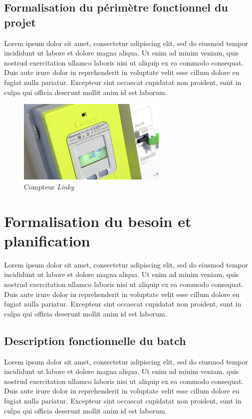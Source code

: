 \documentclass[a4paper, 12pt]{report}
\begin{document}
\subsection{Formalisation du périmètre fonctionnel du projet}

Lorem ipsum dolor sit amet, consectetur adipiscing elit, sed do eiusmod tempor incididunt ut labore et dolore magna aliqua. Ut enim ad minim veniam, quis nostrud exercitation ullamco laboris nisi ut aliquip ex ea commodo consequat. Duis aute irure dolor in reprehenderit in voluptate velit esse cillum dolore eu fugiat nulla pariatur. Excepteur sint occaecat cupidatat non proident, sunt in culpa qui officia deserunt mollit anim id est laborum.

\begin{figure}[b]
  \begin{center}
    \includegraphics[height=4cm]{../res/linky.jpg}
    \caption{Compteur \textit{Linky}}
  \end{center}
\end{figure}

\section{Formalisation du besoin et planification}

Lorem ipsum dolor sit amet, consectetur adipiscing elit, sed do eiusmod tempor incididunt ut labore et dolore magna aliqua. Ut enim ad minim veniam, quis nostrud exercitation ullamco laboris nisi ut aliquip ex ea commodo consequat. Duis aute irure dolor in reprehenderit in voluptate velit esse cillum dolore eu fugiat nulla pariatur. Excepteur sint occaecat cupidatat non proident, sunt in culpa qui officia deserunt mollit anim id est laborum.

\subsection{Description fonctionnelle du batch}

Lorem ipsum dolor sit amet, consectetur adipiscing elit, sed do eiusmod tempor incididunt ut labore et dolore magna aliqua. Ut enim ad minim veniam, quis nostrud exercitation ullamco laboris nisi ut aliquip ex ea commodo consequat. Duis aute irure dolor in reprehenderit in voluptate velit esse cillum dolore eu fugiat nulla pariatur. Excepteur sint occaecat cupidatat non proident, sunt in culpa qui officia deserunt mollit anim id est laborum.
\end{document}
